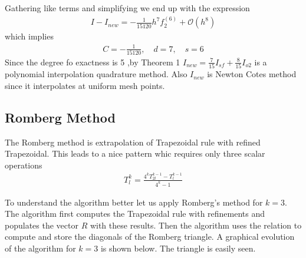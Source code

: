 \documentclass[12pt]{article}
\theoremstyle{remark}
\begin{document}
Gathering like terms and simplifying we end up with the expression
\begin{align}
I - I_{new} = -\frac{1}{15120}h^7f^{(6)}_2 + \mathcal{O}(h^8)
\end{align}
which implies
\begin{align*}
	C = -\frac{1}{15120}, \quad d = 7, \quad s = 6
\end{align*}
Since the degree fo exactness is 5 ,by Theorem 1 $I_{new} = \frac{7}{15}I_{sf} + \frac{8}{15}I_{o2}$ is a polynomial interpolation quadrature method. Also $I_{new}$ is Newton Cotes method since it interpolates at uniform mesh points.

\newpage

\subsection{Romberg Method}

The Romberg method is extrapolation of Trapezoidal rule with refined Trapezoidal. This leads to a nice pattern whic requires only three scalar operations 
\begin{align}
T_l^k = \frac{4^kT_{2l}^{k-1} - T_l^{k-1}}{4^k-1}
\end{align}

To understand the algorithm better let us apply Romberg's method for $k=3$. The algorithm first computes the Trapezoidal rule with refinements and populates the vector $R$ with these results. Then the algorithm uses the relation to compute and store the diagonals of the Romberg triangle. A graphical evolution of the algorithm for $k=3$ is shown below. The triangle is easily seen. \\
\end{document}
